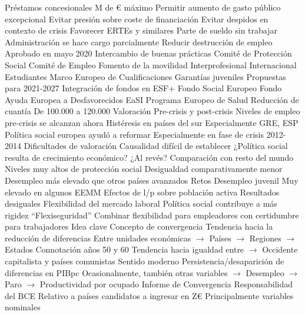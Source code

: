 \documentclass{nuevotema}
\begin{document}
\begin{esquemal}
				\4 Préstamos concesionales
				 M de € máximo
				\4 Permitir aumento de gasto público excepcional
				\4 Evitar presión sobre coste de financiación
				\4 Evitar despidos en contexto de crisis
				\4 Favorecer ERTEs y similares
				\4[] Parte de sueldo sin trabajar
				\4[] Administración se hace cargo parcialmente
				\4[] Reducir destrucción de empleo
				\4 Aprobado en mayo 2020
			\3 Intercambio de buenas prácticas
				\4 Comité de Protección Social
				\4 Comité de Empleo
			\3 Fomento de la movilidad
				\4 Interprofesional
				\4 Internacional
				\4 Estudiantes
				\4 Marco Europeo de Cualificaciones
				\4 Garantías juveniles
			\3 Propuestas para 2021-2027
				\4 Integración de fondos en ESF+
				\4[] Fondo Social Europeo
				\4[] Fondo Ayuda Europea a Desfavorecidos
				\4[] EaSI
				\4[] Programa Europeo de Salud
				\4 Reducción de cuantía
				\4[] De 100.000 a 120.000
		\2 Valoración
			\3 Pre-crisis y post-crisis
				\4 Niveles de empleo pre-crisis se alcanzan ahora
				\4 Histéresis en países del sur
				\4[] Especialmente GRE, ESP
				\4 Política social europea ayudó a reformar
				\4[] Especialmente en fase de crisis 2012-2014
			\3 Dificultades de valoración
				\4 Causalidad difícil de establecer
				\4[] ¿Política social resulta de crecimiento económico?
				\4[] ¿Al revés?
			\3 Comparación con resto del mundo
				\4 Niveles muy altos de protección social
				\4 Desigualdad comparativamente menor
				\4 Desempleo más elevado que otros países avanzados
		\2 Retos
			\3 Desempleo juvenil
				\4 Muy elevado en algunos EEMM
				\4 Efectos de l/p sobre población activa
			\3 Resultados desiguales
			\3 Flexibilidad del mercado laboral
				\4 Política social contribuye a más rigidez
				\4 ``Flexiseguridad''
				\4[] Combinar flexibilidad para empleadores con certidumbre para trabajadores
	\1 
		\2 Idea clave
			\3 Concepto de convergencia
				\4 Tendencia hacia la reducción de diferencias
				\4[] Entre unidades económicas
				\4[] $\to$ Países
				\4[] $\to$ Regiones
				\4[] $\to$ Estados
				\4 Connotación años 50 y 60
				\4[] Tendencia hacia igualdad entre
				\4[] $\to$ Occidente capitalista y países comunistas
				\4 Sentido moderno
				\4[] Persistencia/desaparición de diferencias en PIBpc
				\4[] Ocasionalmente, también otras variables
				\4[] $\to$ Desempleo
				\4[] $\to$ Paro
				\4[] $\to$ Productividad por ocupado
				\4 Informe de Convergencia
				\4[] Responsabilidad del BCE
				\4[] Relativo a países candidatos a ingresar en Z€
				\4[] Principalmente variables nominales

\end{esquemal}
\end{document}
